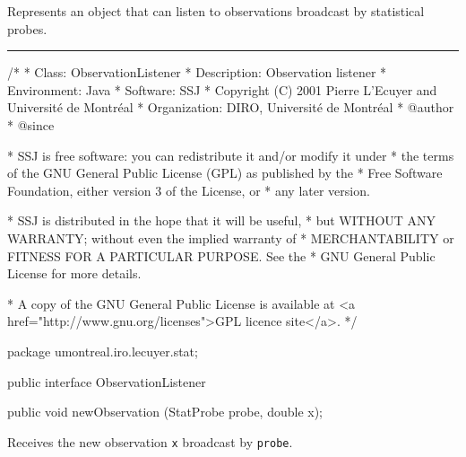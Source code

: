 
Represents an object that can listen to observations broadcast
by statistical probes.

\bigskip\hrule

\begin{code}
\begin{hide}
/*
 * Class:        ObservationListener
 * Description:  Observation listener
 * Environment:  Java
 * Software:     SSJ 
 * Copyright (C) 2001  Pierre L'Ecuyer and Université de Montréal
 * Organization: DIRO, Université de Montréal
 * @author       
 * @since

 * SSJ is free software: you can redistribute it and/or modify it under
 * the terms of the GNU General Public License (GPL) as published by the
 * Free Software Foundation, either version 3 of the License, or
 * any later version.

 * SSJ is distributed in the hope that it will be useful,
 * but WITHOUT ANY WARRANTY; without even the implied warranty of
 * MERCHANTABILITY or FITNESS FOR A PARTICULAR PURPOSE.  See the
 * GNU General Public License for more details.

 * A copy of the GNU General Public License is available at
   <a href="http://www.gnu.org/licenses">GPL licence site</a>.
 */
\end{hide}
package umontreal.iro.lecuyer.stat;


public interface ObservationListener\begin{hide} {\end{hide}

   public void newObservation (StatProbe probe, double x);
\end{code}
\begin{tabb} Receives the new observation \texttt{x} broadcast by \texttt{probe}.
\end{tabb}
\begin{htmlonly}
\end{htmlonly}
\begin{code}\begin{hide}
}\end{hide}
\end{code}
